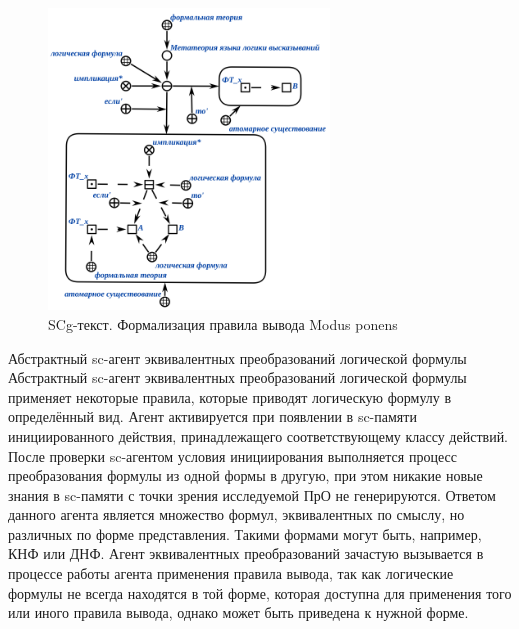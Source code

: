\begin{frame}{}
\begin{figure}[H]
	\caption{SCg-текст. Формализация правила вывода Modus ponens}
	\includegraphics[width=0.9\linewidth, height=8cm]{figures/sc-agents/Modus_ponens.png}
\end{figure}
\end{frame}

\begin{frame}{\Large Абстрактный sc-агент эквивалентных преобразований логической формулы}
\vspace{10mm}
  Абстрактный sc-агент эквивалентных преобразований логической формулы применяет некоторые правила, которые приводят логическую формулу в определённый вид. Агент активируется при появлении в sc-памяти инициированного действия, принадлежащего соответствующему классу действий. После проверки sc-агентом условия инициирования выполняется процесс преобразования формулы из одной формы в другую, при этом никакие новые знания в sc-памяти с точки зрения исследуемой ПрО не генерируются. Ответом данного агента является множество формул, эквивалентных по смыслу, но различных по форме представления. Такими формами могут быть, например, КНФ или ДНФ. Агент эквивалентных преобразований зачастую вызывается в процессе работы агента применения правила вывода, так как логические формулы не всегда находятся в той форме, которая доступна для применения того или иного правила вывода, однако может быть приведена к нужной форме.  
\end{frame}

